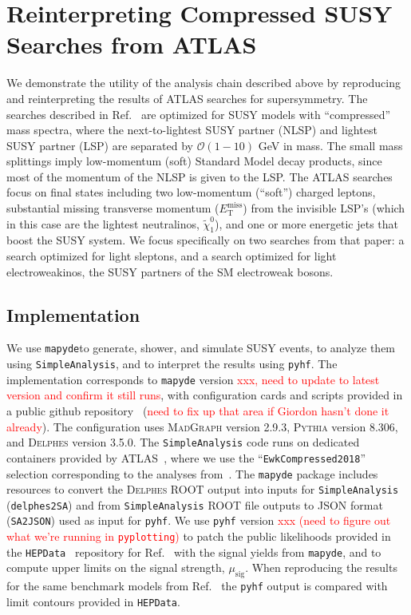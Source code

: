 \documentclass{article}
\newcommand{\chioz}{\ensuremath{\widetilde{\chi}_{1}^{0}}}
\newcommand{\met}{\ensuremath{E_{\mathrm{T}}^{\mathrm{miss}}}}
\newcommand{\mapyde}{\texttt{mapyde}}
\newcommand{\simpleanalysis}{\texttt{SimpleAnalysis}}
\newcommand{\madgraph}{\textsc{MadGraph}}
\newcommand{\pythia}{\textsc{Pythia}}
\newcommand{\delphes}{\textsc{Delphes}}
\newcommand{\pyhf}{\texttt{pyhf}}
\newcommand{\musig}{\ensuremath{\mu_{\mathrm{sig}}}}
\newcommand{\hepdata}{\texttt{HEPData}}
\begin{document}
\section{Reinterpreting Compressed SUSY Searches from ATLAS}
\label{sec:reinterpreting-compressed-susy-searches-from-atlas}

We demonstrate the utility of the analysis chain described above by reproducing and reinterpreting the results of ATLAS searches for supersymmetry.  The searches described in Ref.~\cite{ATLAS:2019lng} are optimized for SUSY models with \enquote{compressed} mass spectra, where the next-to-lightest SUSY partner (NLSP) and lightest SUSY partner (LSP) are separated by $\mathcal{O}(1-10)$ GeV in mass.  The small mass splittings imply low-momentum (soft) Standard Model decay products, since most of the momentum of the NLSP is given to the LSP.  The ATLAS searches focus on final states including two low-momentum (\enquote{soft}) charged leptons, substantial missing transverse momentum (\met) from the invisible LSP's (which in this case are the lightest neutralinos, \chioz), and one or more energetic jets that boost the SUSY system.  We focus specifically on two searches from that paper: a search optimized for light sleptons, and a search optimized for light electroweakinos, the SUSY partners of the SM electroweak bosons.

\subsection{Implementation}
\label{ssec:implementation}

We use \mapyde to generate, shower, and simulate SUSY events, to analyze them using \simpleanalysis, and to interpret the results using \pyhf.  The implementation corresponds to \mapyde{} version \textcolor{red}{xxx, need to update to latest version and confirm it still runs}, with configuration cards and scripts provided in a public github repository~\cite{mapyde-user} (\textcolor{red}{need to fix up that area if Giordon hasn't done it already}).  The configuration uses \madgraph{} version 2.9.3, \pythia{} version 8.306, and \delphes{} version 3.5.0.  The \simpleanalysis{} code runs on dedicated containers provided by ATLAS~\cite{SAGitLabRegistry}, where we use the \enquote{\texttt{EwkCompressed2018}} selection corresponding to the analyses from~\cite{ATLAS:2019lng}.  The \mapyde{} package includes resources to convert the \delphes{} ROOT output into inputs for \simpleanalysis{} (\texttt{delphes2SA}) and from \simpleanalysis{} ROOT file outputs to JSON format (\texttt{SA2JSON}) used as input for \pyhf.  We use \pyhf{} version \textcolor{red}{xxx (need to figure out what we're running in \texttt{pyplotting})} to patch the public likelihoods provided in the \hepdata~\cite{HepData} repository for Ref.~\cite{ATLAS:2019lng} with the signal yields from \mapyde, and to compute upper limits on the signal strength, \musig.  When reproducing the results for the same benchmark models from Ref.~\cite{ATLAS:2019lng} the \pyhf{} output is compared with limit contours provided in \hepdata.
\end{document}
